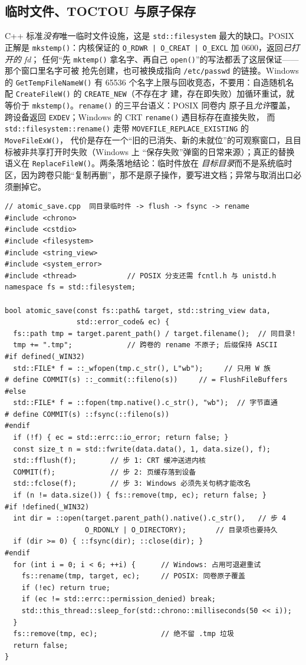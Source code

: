 \documentclass[12pt,a4paper,fontset=fandol]{ctexbook}
\newcommand{\Fn}[1]{\texttt{#1()}}
\newcommand{\Tp}[1]{\texttt{#1}}
\newcommand{\Bk}{\allowbreak}
\begin{document}
\subsection{临时文件、TOCTOU 与原子保存}

C++ 标准\emph{没有}唯一临时文件设施，这是 \Tp{std::filesystem} 最大的缺口。POSIX 正解是
\Fn{mkstemp}：内核保证的 \Tp{O\_RDWR | O\_CREAT | O\_EXCL} 加 0600，返回\emph{已打开的 fd}；
任何``先 \Fn{mktemp} 拿名字、再自己 \Fn{open}''的写法都丢了这层保证——那个窗口里名字可被
抢先创建，也可被换成指向 \Tp{/etc/passwd} 的链接。Windows 的 \Fn{GetTempFileNameW} 有 65536
个名字上限与回收竞态，不要用：自造随机名配 \Fn{CreateFileW} 的 \Tp{CREATE\_NEW}（不存在才
建，存在即失败）加循环重试，就等价于 \Fn{mkstemp}。\Fn{rename} 的三平台语义：POSIX 同卷内
原子且\emph{允许}覆盖，跨设备返回 \Tp{EXDEV}；Windows 的 CRT \Fn{rename} 遇目标存在直接失败，
而 \Fn{std::filesystem::rename} 走带 \Tp{MOVEFILE\_REPLACE\Bk \_EXISTING} 的 \Fn{MoveFileExW}，
代价是存在一个``旧的已消失、新的未就位''的可观察窗口，且目标被非共享打开时失败（Windows 上
``保存失败''弹窗的日常来源）；真正的替换语义在 \Fn{ReplaceFileW}。两条落地结论：临时件放在
\emph{目标目录}而不是系统临时区，因为跨卷只能``复制再删''，那不是原子操作，要写进文档；异常与取消出口必须删掉它。

\begin{lstlisting}[caption={原子保存：写临时件、刷盘、替换（atomic\_save.cpp）}]
// atomic_save.cpp  同目录临时件 -> flush -> fsync -> rename
#include <chrono>
#include <cstdio>
#include <filesystem>
#include <string_view>
#include <system_error>
#include <thread>            // POSIX 分支还需 fcntl.h 与 unistd.h
namespace fs = std::filesystem;

bool atomic_save(const fs::path& target, std::string_view data,
                 std::error_code& ec) {
  fs::path tmp = target.parent_path() / target.filename();  // 同目录!
  tmp += ".tmp";             // 跨卷的 rename 不原子; 后缀保持 ASCII
#if defined(_WIN32)
  std::FILE* f = ::_wfopen(tmp.c_str(), L"wb");     // 只用 W 族
# define COMMIT(s) ::_commit(::fileno(s))     // = FlushFileBuffers
#else
  std::FILE* f = ::fopen(tmp.native().c_str(), "wb");  // 字节直通
# define COMMIT(s) ::fsync(::fileno(s))
#endif
  if (!f) { ec = std::errc::io_error; return false; }
  const size_t n = std::fwrite(data.data(), 1, data.size(), f);
  std::fflush(f);        // 步 1: CRT 缓冲送进内核
  COMMIT(f);             // 步 2: 页缓存落到设备
  std::fclose(f);        // 步 3: Windows 必须先关句柄才能改名
  if (n != data.size()) { fs::remove(tmp, ec); return false; }
#if !defined(_WIN32)
  int dir = ::open(target.parent_path().native().c_str(),   // 步 4
                   O_RDONLY | O_DIRECTORY);       // 目录项也要持久
  if (dir >= 0) { ::fsync(dir); ::close(dir); }
#endif
  for (int i = 0; i < 6; ++i) {      // Windows: 占用可退避重试
    fs::rename(tmp, target, ec);     // POSIX: 同卷原子覆盖
    if (!ec) return true;
    if (ec != std::errc::permission_denied) break;
    std::this_thread::sleep_for(std::chrono::milliseconds(50 << i));
  }
  fs::remove(tmp, ec);               // 绝不留 .tmp 垃圾
  return false;
}
\end{lstlisting}
\end{document}
